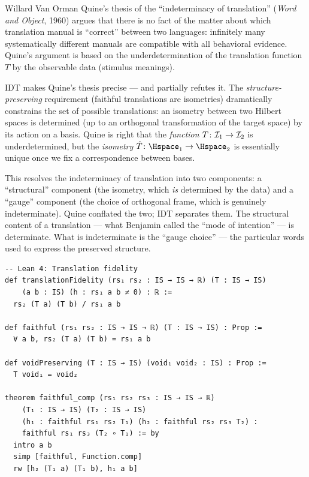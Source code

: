 \begin{interpretation}
\label{interp:ch18:quine_indeterminacy}
Willard Van Orman Quine's thesis of the ``indeterminacy of translation''
(\textit{Word and Object}, 1960) argues that there is no fact of the
matter about which translation manual is ``correct'' between two languages:
infinitely many systematically different manuals are compatible with all
behavioral evidence.  Quine's argument is based on the underdetermination of
the translation function $T$ by the observable data (stimulus meanings).

IDT makes Quine's thesis precise --- and partially refutes it.  The
\emph{structure-preserving} requirement (faithful translations are isometries)
dramatically constrains the set of possible translations: an isometry
between two Hilbert spaces is determined (up to an orthogonal transformation
of the target space) by its action on a basis.  Quine is right that the
\emph{function} $T\colon \mathcal{I}_1 \to \mathcal{I}_2$ is underdetermined, but the
\emph{isometry} $\hat{T}\colon \Hspace_1 \to \Hspace_2$ is essentially
unique once we fix a correspondence between bases.

This resolves the indeterminacy of translation into two components: a
``structural'' component (the isometry, which \emph{is} determined by the
data) and a ``gauge'' component (the choice of orthogonal frame, which is
genuinely indeterminate).  Quine conflated the two; IDT separates them.
The structural content of a translation --- what Benjamin called the ``mode
of intention'' --- is determinate.  What is indeterminate is the ``gauge
choice'' --- the particular words used to express the preserved structure.
\end{interpretation}

\begin{lstlisting}
-- Lean 4: Translation fidelity
def translationFidelity (rs₁ rs₂ : IS → IS → ℝ) (T : IS → IS)
    (a b : IS) (h : rs₁ a b ≠ 0) : ℝ :=
  rs₂ (T a) (T b) / rs₁ a b

def faithful (rs₁ rs₂ : IS → IS → ℝ) (T : IS → IS) : Prop :=
  ∀ a b, rs₂ (T a) (T b) = rs₁ a b

def voidPreserving (T : IS → IS) (void₁ void₂ : IS) : Prop :=
  T void₁ = void₂

theorem faithful_comp (rs₁ rs₂ rs₃ : IS → IS → ℝ)
    (T₁ : IS → IS) (T₂ : IS → IS)
    (h₁ : faithful rs₁ rs₂ T₁) (h₂ : faithful rs₂ rs₃ T₂) :
    faithful rs₁ rs₃ (T₂ ∘ T₁) := by
  intro a b
  simp [faithful, Function.comp]
  rw [h₂ (T₁ a) (T₁ b), h₁ a b]
\end{lstlisting}

